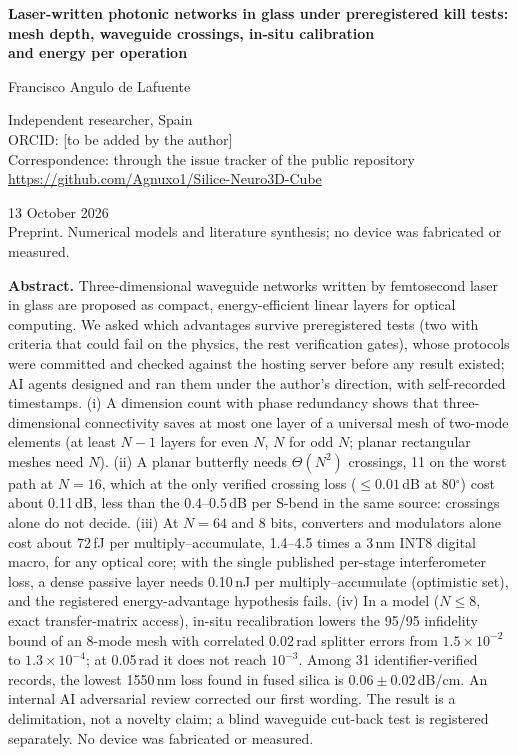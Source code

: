 \documentclass[11pt,a4paper]{article}
\newcommand{\dBcm}{\,dB/cm\xspace}
\newcommand{\dB}{\,dB\xspace}
\newcommand{\fJ}{\,fJ\xspace}
\begin{document}
\begin{titlepage}
\begin{center}
{\LARGE\bfseries Laser-written photonic networks in glass under preregistered kill tests:\\[4pt] mesh depth, waveguide crossings, in-situ calibration\\[4pt] and energy per operation\par}
\vspace{1.4cm}
{\large Francisco Angulo de Lafuente\par}
\vspace{0.3cm}
Independent researcher, Spain\\
ORCID: [to be added by the author]\\
Correspondence: through the issue tracker of the public repository\\
\url{https://github.com/Agnuxo1/Silice-Neuro3D-Cube}\par
\vspace{0.5cm}
13 October 2026\\[2pt]
{\small Preprint. Numerical models and literature synthesis; no device was fabricated or measured.}\par
\end{center}
\vspace{0.8cm}

\noindent\textbf{Abstract.}
Three-dimensional waveguide networks written by femtosecond laser in glass are proposed as compact, energy-efficient linear layers for optical computing. We asked which advantages survive preregistered tests (two with criteria that could fail on the physics, the rest verification gates), whose protocols were committed and checked against the hosting server before any result existed; AI agents designed and ran them under the author's direction, with self-recorded timestamps. (i) A dimension count with phase redundancy shows that three-dimensional connectivity saves at most one layer of a universal mesh of two-mode elements (at least $N-1$ layers for even $N$, $N$ for odd $N$; planar rectangular meshes need $N$). (ii) A planar butterfly needs $\Theta(N^2)$ crossings, 11 on the worst path at $N=16$, which at the only verified crossing loss ($\le0.01$\dB at 80$^\circ$) cost about 0.11\dB, less than the 0.4--0.5\dB per S-bend in the same source: crossings alone do not decide. (iii) At $N=64$ and 8 bits, converters and modulators alone cost about 72\fJ per multiply--accumulate, 1.4--4.5 times a 3\,nm INT8 digital macro, for any optical core; with the single published per-stage interferometer loss, a dense passive layer needs 0.10\,nJ per multiply--accumulate (optimistic set), and the registered energy-advantage hypothesis fails. (iv) In a model ($N\le8$, exact transfer-matrix access), in-situ recalibration lowers the 95/95 infidelity bound of an 8-mode mesh with correlated 0.02\,rad splitter errors from $1.5\times10^{-2}$ to $1.3\times10^{-4}$; at 0.05\,rad it does not reach $10^{-3}$. Among 31 identifier-verified records, the lowest 1550\,nm loss found in fused silica is $0.06\pm0.02$\dBcm. An internal AI adversarial review corrected our first wording. The result is a delimitation, not a novelty claim; a blind waveguide cut-back test is registered separately. No device was fabricated or measured.


\end{titlepage}
\end{document}
